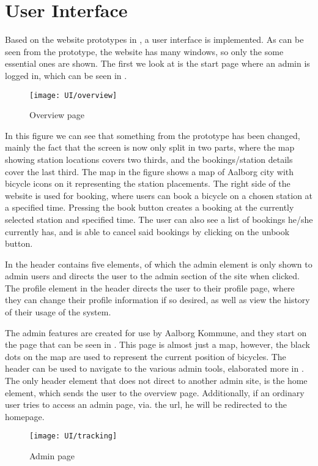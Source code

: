 \section{User Interface}
Based on the website prototypes in , a user interface is implemented.
As can be seen from the prototype, the website has many windows, so only the some essential ones are shown.
The first we look at is the start page where an admin is logged in, which can be seen in .

\begin{figure}[h]
	\centering
	\texttt{[image: UI/overview]}
	\caption{Overview page}\label{fig:UI-overview}
\end{figure}

In this figure we can see that something from the prototype has been changed, mainly the fact that the screen is now only split in two parts, where the map showing station locations covers two thirds, and the bookings/station details cover the last third.
The map in the figure shows a map of Aalborg city with bicycle icons on it representing the station placements.
The right side of the website is used for booking, where users can book a bicycle on a chosen station at a specified time.
Pressing the book button creates a booking at the currently selected station and specified time.
The user can also see a list of bookings he/she currently has, and is able to cancel said bookings by clicking on the unbook button.

In  the header contains five elements, of which the admin element is only shown to admin users and directs the user to the admin section of the site when clicked.
The profile element in the header directs the user to their profile page, where they can change their profile information if so desired, as well as view the history of their usage of the system.


The admin features are created for use by Aalborg Kommune, and they start on the page that can be seen in .
This page is almost just a map, however, the black dots on the map are used to represent the current position of bicycles.
The header can be used to navigate to the various admin tools, elaborated more in .
The only header element that does not direct to another admin site, is the home element, which sends the user to the overview page.
Additionally, if an ordinary user tries to access an admin page, via. the url, he will be redirected to the homepage.

\begin{figure}[h]
	\centering
	\texttt{[image: UI/tracking]}
	\caption{Admin page}\label{fig:UI-admin}
\end{figure}
